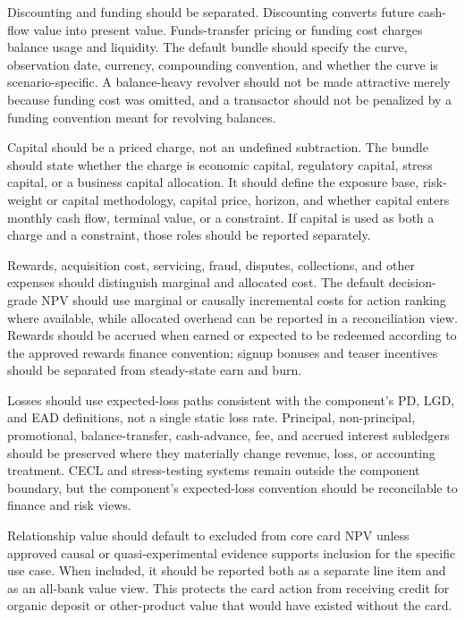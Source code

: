 \documentclass[11pt]{article}
\newcommand{\1}{\mathbf{1}}
\begin{document}
Discounting and funding should be separated. Discounting converts future
cash-flow value into present value. Funds-transfer pricing or funding cost
charges balance usage and liquidity. The default bundle should specify the
curve, observation date, currency, compounding convention, and whether the
curve is scenario-specific. A balance-heavy revolver should not be made
attractive merely because funding cost was omitted, and a transactor should
not be penalized by a funding convention meant for revolving balances.

Capital should be a priced charge, not an undefined subtraction. The bundle
should state whether the charge is economic capital, regulatory capital,
stress capital, or a business capital allocation. It should define the exposure
base, risk-weight or capital methodology, capital price, horizon, and whether
capital enters monthly cash flow, terminal value, or a constraint. If capital
is used as both a charge and a constraint, those roles should be reported
separately.

Rewards, acquisition cost, servicing, fraud, disputes, collections, and other
expenses should distinguish marginal and allocated cost. The default
decision-grade NPV should use marginal or causally incremental costs for action
ranking where available, while allocated overhead can be reported in a
reconciliation view. Rewards should be accrued when earned or expected to be
redeemed according to the approved rewards finance convention; signup bonuses
and teaser incentives should be separated from steady-state earn and burn.

Losses should use expected-loss paths consistent with the component's PD, LGD,
and EAD definitions, not a single static loss rate. Principal,
non-principal, promotional, balance-transfer, cash-advance, fee, and accrued
interest subledgers should be preserved where they materially change revenue,
loss, or accounting treatment. CECL and stress-testing systems remain outside
the component boundary, but the component's expected-loss convention should be
reconcilable to finance and risk views.

Relationship value should default to excluded from core card NPV unless
approved causal or quasi-experimental evidence supports inclusion for the
specific use case. When included, it should be reported both as a separate
line item and as an all-bank value view. This protects the card action from
receiving credit for organic deposit or other-product value that would have
existed without the card.
\end{document}
